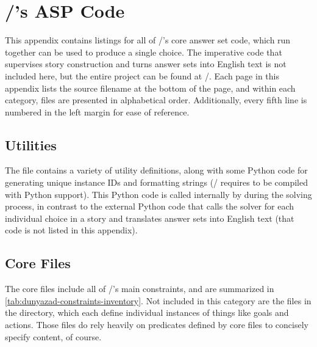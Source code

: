\chapter{\dunyazad/'s ASP Code}
\label{ap:src}%

This appendix contains listings for all of \dunyazad/'s core answer set code, which run together can be used to produce a single choice.
%
The imperative code that supervises story construction and turns answer sets into English text is not included here, but the entire project can be found at \githuburl/.
%
Each page in this appendix lists the source filename at the bottom of the page, and within each category, files are presented in alphabetical order.
%
Additionally, every fifth line is numbered in the left margin for ease of reference.

\section{Utilities}

The  file contains a variety of utility definitions, along with some Python code for generating unique instance IDs and formatting strings (\dunyazad/ requires  to be compiled with Python support).
%
This Python code is called internally by  during the solving process, in contrast to the external Python code that calls the solver for each individual choice in a story and translates answer sets into English text (that code is not listed in this appendix).


\section{Core Files}

The core files include all of \dunyazad/'s main constraints, and are summarized in \cref{tab:dunyazad-constraints-inventory}.
%
Not included in this category are the files in the  directory, which each define individual instances of things like goals and actions.
%
Those files do rely heavily on predicates defined by core files to concisely specify content, of course.


